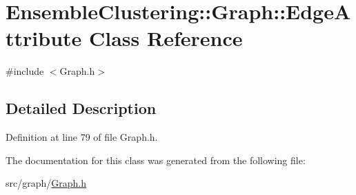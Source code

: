 \hypertarget{class_ensemble_clustering_1_1_graph_1_1_edge_attribute}{\section{Ensemble\-Clustering\-:\-:Graph\-:\-:Edge\-Attribute Class Reference}
\label{class_ensemble_clustering_1_1_graph_1_1_edge_attribute}
}


{\ttfamily \#include $<$Graph.\-h$>$}



\subsection{Detailed Description}


Definition at line 79 of file Graph.\-h.



The documentation for this class was generated from the following file\-:\begin{DoxyCompactItemize}
\item 
src/graph/\hyperlink{_graph_8h}{Graph.\-h}\end{DoxyCompactItemize}
